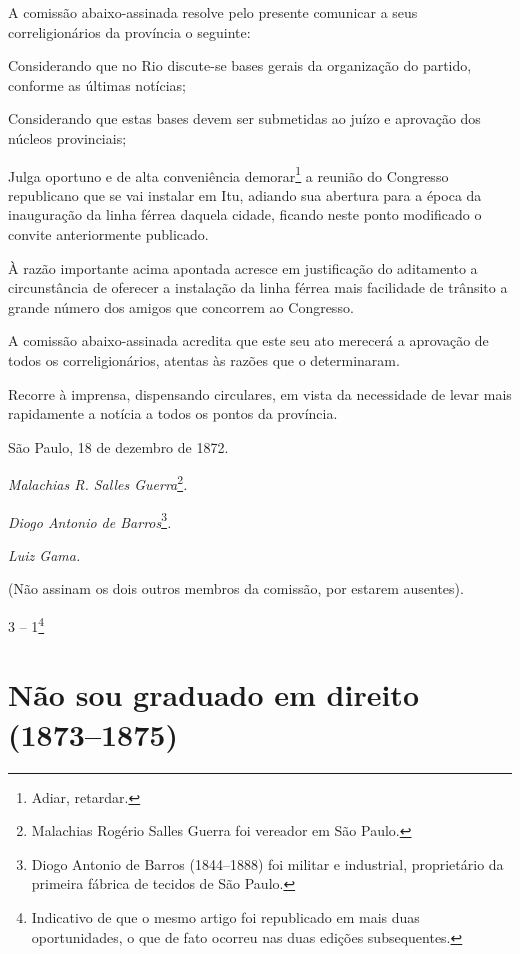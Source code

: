 \asterisc{}

A comissão abaixo-assinada resolve pelo presente comunicar a seus
correligionários da província o seguinte:

Considerando que no Rio discute-se bases gerais da organização do
partido, conforme as últimas notícias;

Considerando que estas bases devem ser submetidas ao juízo e aprovação
dos núcleos provinciais;

Julga oportuno e de alta conveniência demorar\footnote{ Adiar,
  retardar.} a reunião do Congresso republicano que se vai instalar em
Itu, adiando sua abertura para a época da inauguração da linha férrea
daquela cidade, ficando neste ponto modificado o convite anteriormente
publicado.

À razão importante acima apontada acresce em justificação do aditamento
a circunstância de oferecer a instalação da linha férrea mais facilidade
de trânsito a grande número dos amigos que concorrem ao Congresso.

A comissão abaixo-assinada acredita que este seu ato merecerá a
aprovação de todos os correligionários, atentas às razões que o
determinaram.

Recorre à imprensa, dispensando circulares, em vista da necessidade de
levar mais rapidamente a notícia a todos os pontos da província.

São Paulo, 18 de dezembro de 1872.

\emph{Malachias R. Salles Guerra}\footnote{ Malachias Rogério Salles
  Guerra foi vereador em São Paulo.}\emph{.}

\emph{Diogo Antonio de Barros}\footnote{ Diogo Antonio de Barros
  (1844--1888) foi militar e industrial, proprietário da primeira fábrica
  de tecidos de São Paulo.}\emph{.}

\emph{Luiz Gama.}

(Não assinam os dois outros membros da comissão, por estarem ausentes).

3 -- 1\footnote{ Indicativo de que o mesmo artigo foi republicado em
  mais duas oportunidades, o que de fato ocorreu nas duas edições
  subsequentes.}

\part{Não sou graduado em direito (1873--1875)}

